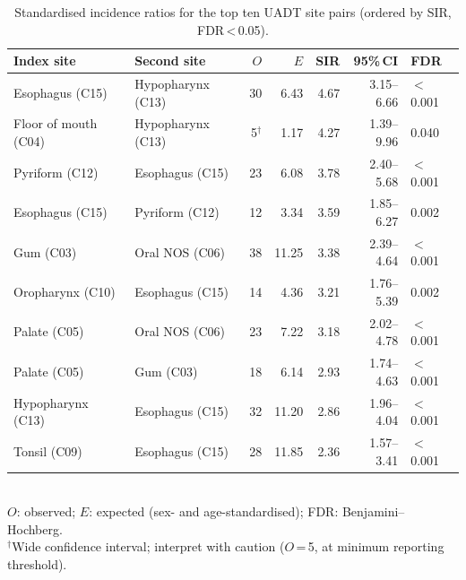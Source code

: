 \documentclass[12pt,a4paper]{article}
\begin{document}
\begin{table}[ht]
\centering
\caption{Standardised incidence ratios for the top ten UADT site pairs
(ordered by SIR, FDR\,<\,0.05).}
\label{tab:sir}
\begin{tabular}{llrrrrl}
\toprule
Index site & Second site & $O$ & $E$ & SIR & 95\%\,CI & FDR \\
\midrule
Esophagus (C15)   & Hypopharynx (C13) & 30 & 6.43 & 4.67 & 3.15--6.66 & $<$0.001 \\
Floor of mouth (C04) & Hypopharynx (C13) & 5$^\dagger$ & 1.17 & 4.27 & 1.39--9.96 & 0.040 \\
Pyriform (C12)    & Esophagus (C15)   & 23 & 6.08 & 3.78 & 2.40--5.68 & $<$0.001 \\
Esophagus (C15)   & Pyriform (C12)    & 12 & 3.34 & 3.59 & 1.85--6.27 & 0.002 \\
Gum (C03)         & Oral NOS (C06)    & 38 & 11.25 & 3.38 & 2.39--4.64 & $<$0.001 \\
Oropharynx (C10)  & Esophagus (C15)   & 14 & 4.36 & 3.21 & 1.76--5.39 & 0.002 \\
Palate (C05)      & Oral NOS (C06)    & 23 & 7.22 & 3.18 & 2.02--4.78 & $<$0.001 \\
Palate (C05)      & Gum (C03)         & 18 & 6.14 & 2.93 & 1.74--4.63 & $<$0.001 \\
Hypopharynx (C13) & Esophagus (C15)   & 32 & 11.20 & 2.86 & 1.96--4.04 & $<$0.001 \\
Tonsil (C09)      & Esophagus (C15)   & 28 & 11.85 & 2.36 & 1.57--3.41 & $<$0.001 \\
\bottomrule
\end{tabular}\\[0.5em]
\small $O$: observed; $E$: expected (sex- and age-standardised); FDR: Benjamini--Hochberg.\\
\small $^\dagger$Wide confidence interval; interpret with caution ($O$\,=\,5, at minimum reporting threshold).
\end{table}
\end{document}
